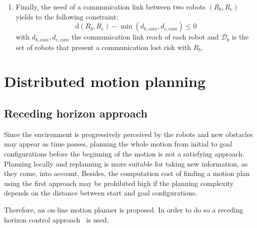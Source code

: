 \begin{enumerate}
    \item Finally, the need of a communication link between two robots $(R_b, R_c)$ yields to
    the following constraint:
    \begin{equation}\label{eq:com}
    	\mathrm{d}(R_b,R_c)  - \min(d_{b,com}, d_{c,com}) \leq 0
    \end{equation}
    with $d_{b,com}, d_{c,com}$ the communication link reach of each robot and
    $\mathcal{D}_b$ is the set of robots that present a communication lost risk with
    $R_b$.
\end{enumerate}



\section{Distributed motion planning}



\subsection{Receding horizon approach}\label{subsec:rha}


Since the environment is progressively perceived by the robots and new obstacles may 
appear as time passes,
planning the whole motion from initial to goal configurations before the beginning
of the motion is
not a satisfying approach. Planning locally and replanning is 
more suitable for taking new information, as they come, into account. Besides, the computation cost of finding a motion plan using
the first approach may be prohibited high if the planning complexity depends
on the distance between start and goal configurations.

Therefore, an on-line motion planner 
is proposed.
In order to do so a receding horizon control approach~\cite{Keviczky2006} is used.

